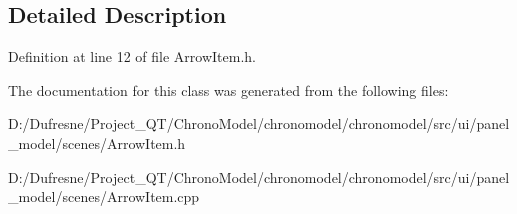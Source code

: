 \subsection{Detailed Description}


Definition at line 12 of file Arrow\-Item.\-h.



The documentation for this class was generated from the following files\-:\begin{DoxyCompactItemize}
\item 
D\-:/\-Dufresne/\-Project\-\_\-\-Q\-T/\-Chrono\-Model/chronomodel/chronomodel/src/ui/panel\-\_\-model/scenes/Arrow\-Item.\-h\item 
D\-:/\-Dufresne/\-Project\-\_\-\-Q\-T/\-Chrono\-Model/chronomodel/chronomodel/src/ui/panel\-\_\-model/scenes/Arrow\-Item.\-cpp\end{DoxyCompactItemize}

